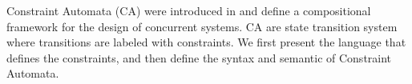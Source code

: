 Constraint Automata (CA) were introduced in \cite{MSA03} and define a compositional framework for the design of concurrent systems. CA are state transition system where transitions are labeled with constraints. We first present the language that defines the constraints, and then define the syntax and semantic of Constraint Automata. 
